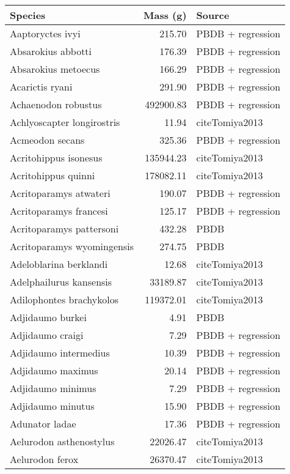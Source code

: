 \begin{table}[ht]
\centering
\begin{tabular}{lrl}
  \hline
Species & Mass (g) & Source \\ 
  \hline
Aaptoryctes ivyi & 215.70 & PBDB + regression \\ 
  Absarokius abbotti & 176.39 & PBDB + regression \\ 
  Absarokius metoecus & 166.29 & PBDB + regression \\ 
  Acarictis ryani & 291.90 & PBDB + regression \\ 
  Achaenodon robustus & 492900.83 & PBDB + regression \\ 
  Achlyoscapter longirostris & 11.94 & cite{Tomiya2013} \\ 
  Acmeodon secans & 325.36 & PBDB + regression \\ 
  Acritohippus isonesus & 135944.23 & cite{Tomiya2013} \\ 
  Acritohippus quinni & 178082.11 & cite{Tomiya2013} \\ 
  Acritoparamys atwateri & 190.07 & PBDB + regression \\ 
  Acritoparamys francesi & 125.17 & PBDB + regression \\ 
  Acritoparamys pattersoni & 432.28 & PBDB \\ 
  Acritoparamys wyomingensis & 274.75 & PBDB \\ 
  Adeloblarina berklandi & 12.68 & cite{Tomiya2013} \\ 
  Adelphailurus kansensis & 33189.87 & cite{Tomiya2013} \\ 
  Adilophontes brachykolos & 119372.01 & cite{Tomiya2013} \\ 
  Adjidaumo burkei & 4.91 & PBDB \\ 
  Adjidaumo craigi & 7.29 & PBDB + regression \\ 
  Adjidaumo intermedius & 10.39 & PBDB + regression \\ 
  Adjidaumo maximus & 20.14 & PBDB + regression \\ 
  Adjidaumo minimus & 7.29 & PBDB + regression \\ 
  Adjidaumo minutus & 15.90 & PBDB + regression \\ 
  Adunator ladae & 17.36 & PBDB + regression \\ 
  Aelurodon asthenostylus & 22026.47 & cite{Tomiya2013} \\ 
  Aelurodon ferox & 26370.47 & cite{Tomiya2013} \\ 

\end{tabular}
\end{table}
